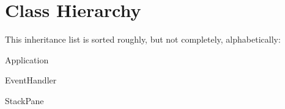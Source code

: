 \section{Class Hierarchy}
This inheritance list is sorted roughly, but not completely, alphabetically\+:\begin{DoxyCompactList}
\item Application\begin{DoxyCompactList}
\item {}
\end{DoxyCompactList}
\item Event\+Handler\begin{DoxyCompactList}
\item {}
\end{DoxyCompactList}
\item {}
\item Stack\+Pane\begin{DoxyCompactList}
\item {}
\end{DoxyCompactList}
\end{DoxyCompactList}
